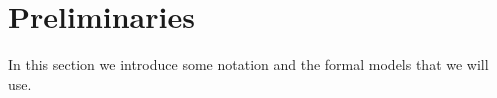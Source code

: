 \section{Preliminaries}\label{Preliminaries}

In this section we introduce some notation and the formal models that we will 
use.




